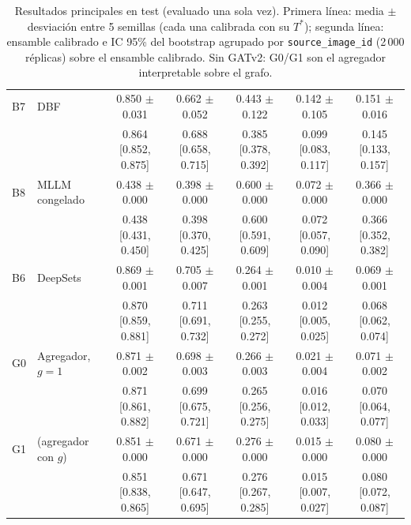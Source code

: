 \begin{table}[H]
{\begin{tabular}{llccccc}
B7 & DBF & 0.850 $\pm$ 0.031 & 0.662 $\pm$ 0.052 & 0.443 $\pm$ 0.122 & 0.142 $\pm$ 0.105 & 0.151 $\pm$ 0.016 \\
 & & {\scriptsize 0.864 [0.852, 0.875]} & {\scriptsize 0.688 [0.658, 0.715]} & {\scriptsize 0.385 [0.378, 0.392]} & {\scriptsize 0.099 [0.083, 0.117]} & {\scriptsize 0.145 [0.133, 0.157]} \\
B8 & MLLM congelado & 0.438 $\pm$ 0.000 & 0.398 $\pm$ 0.000 & 0.600 $\pm$ 0.000 & 0.072 $\pm$ 0.000 & 0.366 $\pm$ 0.000 \\
 & & {\scriptsize 0.438 [0.431, 0.450]} & {\scriptsize 0.398 [0.370, 0.425]} & {\scriptsize 0.600 [0.591, 0.609]} & {\scriptsize 0.072 [0.057, 0.090]} & {\scriptsize 0.366 [0.352, 0.382]} \\
\midrule
\rowcolor{black!6} B6 & DeepSets & 0.869 $\pm$ 0.001 & 0.705 $\pm$ 0.007 & 0.264 $\pm$ 0.001 & 0.010 $\pm$ 0.004 & 0.069 $\pm$ 0.001 \\
\rowcolor{black!6}  & & {\scriptsize 0.870 [0.859, 0.881]} & {\scriptsize 0.711 [0.691, 0.732]} & {\scriptsize 0.263 [0.255, 0.272]} & {\scriptsize 0.012 [0.005, 0.025]} & {\scriptsize 0.068 [0.062, 0.074]} \\
\rowcolor{black!6} G0 & Agregador, $g=1$ & 0.871 $\pm$ 0.002 & 0.698 $\pm$ 0.003 & 0.266 $\pm$ 0.003 & 0.021 $\pm$ 0.004 & 0.071 $\pm$ 0.002 \\
\rowcolor{black!6}  & & {\scriptsize 0.871 [0.861, 0.882]} & {\scriptsize 0.699 [0.675, 0.721]} & {\scriptsize 0.265 [0.256, 0.275]} & {\scriptsize 0.016 [0.012, 0.033]} & {\scriptsize 0.070 [0.064, 0.077]} \\
\rowcolor{black!6} G1 & \modelo{} (agregador con $g$) & 0.851 $\pm$ 0.000 & 0.671 $\pm$ 0.000 & 0.276 $\pm$ 0.000 & 0.015 $\pm$ 0.000 & 0.080 $\pm$ 0.000 \\
\rowcolor{black!6}  & & {\scriptsize 0.851 [0.838, 0.865]} & {\scriptsize 0.671 [0.647, 0.695]} & {\scriptsize 0.276 [0.267, 0.285]} & {\scriptsize 0.015 [0.007, 0.027]} & {\scriptsize 0.080 [0.072, 0.087]} \\
\bottomrule
\end{tabular}}
\caption{Resultados principales en test (evaluado una sola vez). Primera línea: media $\pm$ desviación entre 5 semillas (cada una calibrada con su $T^\ast$); segunda línea: ensamble calibrado e IC 95\% del bootstrap agrupado por \texttt{source\_image\_id} (2\,000 réplicas) sobre el ensamble calibrado. Sin GATv2: G0/G1 son el agregador interpretable sobre el grafo.}
\label{tab:resultados_main}
\end{table}
